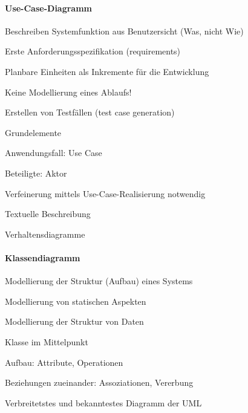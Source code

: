 \documentclass[a4paper]{article}
\begin{document}
\begin{multicols}{3}
  \paragraph{Use-Case-Diagramm}
  \begin{itemize*}
    \item Beschreiben Systemfunktion aus Benutzersicht (Was, nicht Wie)
    \item Erste Anforderungsspezifikation (requirements)
    \item Planbare Einheiten als Inkremente für die Entwicklung
    \item Keine Modellierung eines Ablaufs!
    \item Erstellen von Testfällen (test case generation)
    \item Grundelemente
          \begin{itemize*}
            \item Anwendungsfall: Use Case
            \item Beteiligte: Aktor
          \end{itemize*}
    \item Verfeinerung mittels Use-Case-Realisierung notwendig
          \begin{itemize*}
            \item Textuelle Beschreibung
            \item Verhaltensdiagramme
          \end{itemize*}
  \end{itemize*}

  \paragraph{Klassendiagramm}
  \begin{itemize*}
    \item Modellierung der Struktur (Aufbau) eines Systems
    \item Modellierung von statischen Aspekten
    \item Modellierung der Struktur von Daten
    \item Klasse im Mittelpunkt
          \begin{itemize*}
            \item Aufbau: Attribute, Operationen
            \item Beziehungen zueinander: Assoziationen, Vererbung
          \end{itemize*}
    \item Verbreitetstes und bekanntestes Diagramm der UML
  \end{itemize*}


\end{multicols}
\end{document}
